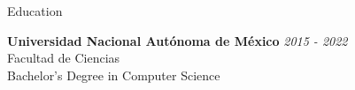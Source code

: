 \documentclass{resume} %
\begin{document}

\begin{rSection}{Education}

{\bf Universidad Nacional Autónoma de México} \hfill {\em 2015 - 2022}
\\ Facultad de Ciencias
\\ Bachelor's Degree in Computer Science

\end{rSection}

\end{document}

